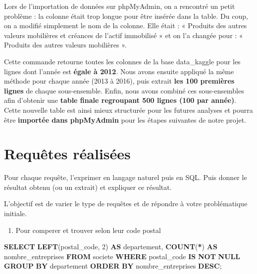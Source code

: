 \documentclass[mstat,12pt]{unswthesis}
\newenvironment{Shaded}{\begin{snugshade}}{\end{snugshade}}
\newcommand{\DecValTok}[1]{\textcolor[rgb]{0.00,0.00,0.81}{#1}}
\newcommand{\FunctionTok}[1]{\textcolor[rgb]{0.13,0.29,0.53}{\textbf{#1}}}
\newcommand{\KeywordTok}[1]{\textcolor[rgb]{0.13,0.29,0.53}{\textbf{#1}}}
\newcommand{\NormalTok}[1]{#1}
\newcommand{\OperatorTok}[1]{\textcolor[rgb]{0.81,0.36,0.00}{\textbf{#1}}}
\begin{document}
Lors de l'importation de données sur phpMyAdmin, on a rencontré un petit
problème : la colonne était trop longue pour être insérée dans la table.
Du coup, on a modifié simplement le nom de la colonne. Elle était : «
Produits des autres valeurs mobilières et créances de l'actif immobilisé
» et on l'a changée pour : « Produits des autres valeurs mobilières ».

\medskip

Cette commande retourne toutes les colonnes de la base data\_kaggle pour
les lignes dont l'année est \textbf{égale à 2012}. Nous avons ensuite
appliqué la même méthode pour chaque année (2013 à 2016), puis extrait
\textbf{les 100 premières lignes} de chaque sous-ensemble. Enfin, nous
avons combiné ces sous-ensembles afin d'obtenir une \textbf{table finale
regroupant 500 lignes (100 par année)}. Cette nouvelle table est ainsi
mieux structurée pour les futures analyses et pourra être
\textbf{importée dans phpMyAdmin} pour les étapes suivantes de notre
projet.

\newpage

\newpage

\section{Requêtes réalisées}\label{requuxeates-ruxe9alisuxe9es}

Pour chaque requête, l'exprimer en langage naturel puis en SQL. Puis
donner le résultat obtenu (ou un extrait) et expliquer ce résultat.

L'objectif est de varier le type de requêtes et de répondre à votre
problématique initiale.

\begin{enumerate}
\def\labelenumi{\arabic{enumi})}
\tightlist
\item
  Pour comperer et trouver selon leur code postal
\end{enumerate}

\begin{Shaded}
\begin{Highlighting}[]

\KeywordTok{SELECT} 
    \KeywordTok{LEFT}\NormalTok{(postal\_code, }\DecValTok{2}\NormalTok{) }\KeywordTok{AS}\NormalTok{ departement,}
    \FunctionTok{COUNT}\NormalTok{(}\OperatorTok{*}\NormalTok{) }\KeywordTok{AS}\NormalTok{ nombre\_entreprises}
\KeywordTok{FROM} 
\NormalTok{    societe}
\KeywordTok{WHERE} 
\NormalTok{    postal\_code }\KeywordTok{IS} \KeywordTok{NOT} \KeywordTok{NULL}
\KeywordTok{GROUP} \KeywordTok{BY} 
\NormalTok{    departement}
\KeywordTok{ORDER} \KeywordTok{BY} 
\NormalTok{    nombre\_entreprises }\KeywordTok{DESC}\NormalTok{;}
\end{Highlighting}
\end{Shaded}
\end{document}
